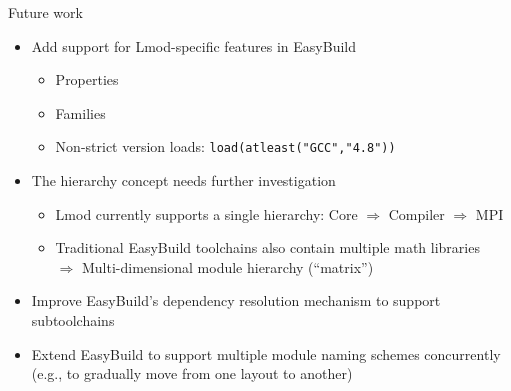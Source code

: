\documentclass[10pt,xcolor={usenames,dvipsnames}]{beamer}
\begin{document}
\begin{frame}{Future work}
\begin{itemize}
    \item
        Add support for Lmod-specific features in EasyBuild
        \begin{itemize}
            \item
                Properties
            \item
                Families
            \item
                Non-strict version loads: \texttt{load(atleast("GCC","4.8"))}
        \end{itemize}
    \smallskip
    \item
        The hierarchy concept needs further investigation
        \begin{itemize}
            \item
                Lmod currently supports a single hierarchy:
                Core $\Rightarrow$ Compiler $\Rightarrow$ MPI
            \item
                Traditional EasyBuild toolchains also contain multiple math
                libraries\\
                $\Rightarrow$ Multi-dimensional module hierarchy (``matrix'')
        \end{itemize}
    \smallskip
    \item
        Improve EasyBuild's dependency resolution mechanism to support
        subtoolchains
    \smallskip
    \item
        Extend EasyBuild to support multiple module naming schemes concurrently
        (e.g., to gradually move from one layout to another)
\end{itemize}
\end{frame}

\end{document}
